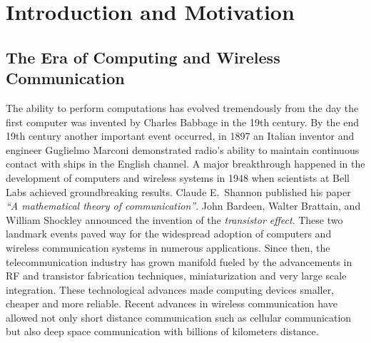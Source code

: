\chapter{Introduction and Motivation} \label{chap:introduction}

\section{The Era of Computing and Wireless Communication}
The ability to perform computations has evolved tremendously from the day the first computer was invented by Charles Babbage in the 19th century. By the end 19th century another important event occurred, in 1897 an Italian inventor and engineer Guglielmo Marconi demonstrated radio's ability to maintain continuous contact with ships in the English channel. A major breakthrough happened in the development of computers and wireless systems in 1948 when scientists at Bell Labs achieved groundbreaking results. Claude E.~Shannon published his paper \emph{``A mathematical theory of communication''}. John Bardeen, Walter Brattain, and William Shockley announced the invention of the \emph{transistor effect}. These two landmark events paved way for the widespread adoption of computers and wireless communication systems in numerous applications. Since then, the telecommunication industry has grown manifold fueled by the advancements in RF and transistor fabrication techniques, miniaturization and very large scale integration. These technological advances made computing devices smaller, cheaper and more reliable. Recent advances in wireless communication have allowed not only short distance communication such as cellular communication but also deep space communication with billions of kilometers distance.  \newline

